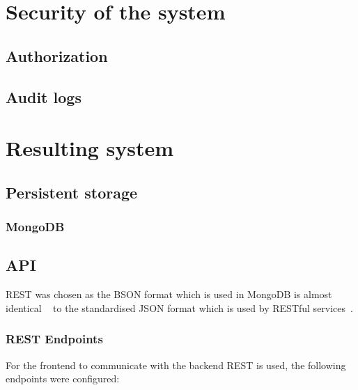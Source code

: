 \documentclass[a4paper,12pt]{article}
\begin{document}
\section{Security of the system}
\subsection{Authorization}
\subsection{Audit logs}


\section{Resulting system}
\subsection{Persistent storage}
\subsubsection{MongoDB}

\subsection{API}
REST was chosen as the BSON format which is used in MongoDB is almost identical ~\cite{BSON} to the standardised JSON 
format which is used by RESTful services~\cite{JSON}. 

\subsubsection{REST Endpoints}
For the frontend to communicate with the backend REST is used, the following endpoints were configured:
\end{document}
